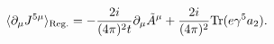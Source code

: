 \begin{equation}
\langle \partial_\mu J^{5\mu}\rangle_{\rm Reg.} = -{{2i}\over
{(4\pi)^2 t}}\partial_\mu \tilde A^\mu + {{2i}\over
{(4\pi)^2}}{\rm Tr}(e\gamma^5 a_2).
\end{equation}

